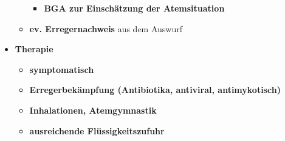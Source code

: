 \begin{itemize}
\begin{itemize}
\begin{itemize}
							\item \textbf{BGA zur Einschätzung der Atemsituation}
						\end{itemize}
					\item \textbf{ev. Erregernachweis} aus dem Auswurf
				\end{itemize}
			\item \textbf{Therapie}
				\begin{itemize}
					\item \textbf{symptomatisch}
					\item \textbf{Erregerbekämpfung (Antibiotika, antiviral, antimykotisch)}
					\item \textbf{Inhalationen, Atemgymnastik}
					\item \textbf{ausreichende Flüssigkeitszufuhr}
				\end{itemize}
		\end{itemize}
